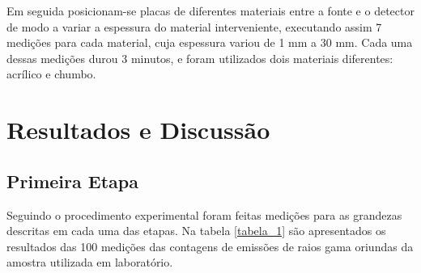 \documentclass{article}
\begin{document}
Em seguida posicionam-se placas de diferentes materiais entre a fonte e o detector de modo a variar a espessura do material interveniente, executando assim 7 medições para cada material, cuja espessura variou de 1 mm a 30 mm. Cada uma dessas medições durou 3 minutos, e foram utilizados dois materiais diferentes: acrílico e chumbo.

\section{Resultados e Discussão}

\subsection{Primeira Etapa}

Seguindo o procedimento experimental foram feitas medições para as grandezas descritas em cada uma das etapas. Na tabela \ref{tabela_1}  são apresentados os resultados das 100 medições das contagens de emissões de raios gama oriundas da amostra utilizada em laboratório. 
\end{document}
